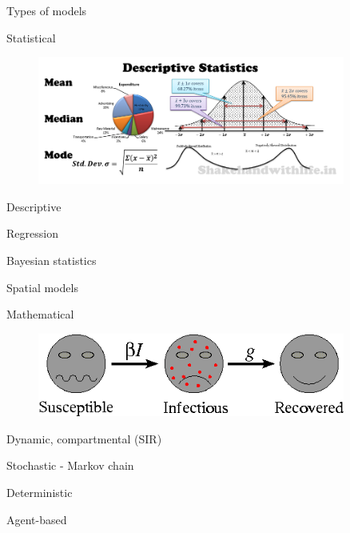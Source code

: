 \documentclass[table,notes]{beamer}\usepackage[]{graphicx}\usepackage[]{color}
\begin{document}
\begin{frame}[fragile]{Types of models}

\begin{block}{Statistical}
\begin{minipage}{.49\textwidth}
\begin{figure}
  \flushleft
  \includegraphics[width=0.9\textwidth,keepaspectratio]{statistics2.png}
\end{figure}
\end{minipage}
\begin{minipage}{.49\textwidth}
Descriptive \par
\vspace{0.1cm}
Regression \par
\vspace{0.1cm}
Bayesian statistics \par
\vspace{0.1cm}
Spatial models
\end{minipage} \hfill
\end{block}
\begin{block}{Mathematical}
\begin{minipage}{.49\textwidth}
\begin{figure}
  \flushleft
  \includegraphics[width=0.9\textwidth,keepaspectratio]{sir2.png}
\end{figure}
\end{minipage} \hfill %
\begin{minipage}{.49\textwidth}
Dynamic, compartmental (SIR) \par %
\vspace{0.1cm}
Stochastic - Markov chain \par
\vspace{0.1cm}
Deterministic \par
\vspace{0.1cm}
Agent-based
\end{minipage}
\end{block}

\end{frame}
\end{document}
